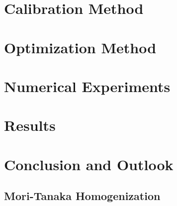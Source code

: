 \documentclass[pdflatex,sn-basic]{template/sn-jnl}%
\begin{document}
\section{Calibration Method}\label{sec:calibration}


\section{Optimization Method}\label{sec:optimization}


\section{Numerical Experiments}\label{sec:numericalexperiments}


\section{Results}\label{sec:results}


\section{Conclusion and Outlook}\label{sec:results}




\begin{appendices}
\section{Mori-Tanaka Homogenization}\label{appendix:hom}


\end{appendices}



\end{document}
